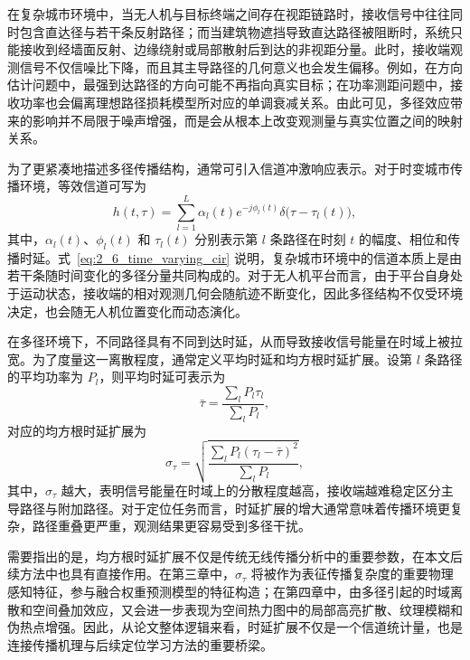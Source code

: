 在复杂城市环境中，当无人机与目标终端之间存在视距链路时，接收信号中往往同时包含直达径与若干条反射路径；而当建筑物遮挡导致直达路径被阻断时，系统只能接收到经墙面反射、边缘绕射或局部散射后到达的非视距分量。此时，接收端观测信号不仅信噪比下降，而且其主导路径的几何意义也会发生偏移。例如，在方向估计问题中，最强到达路径的方向可能不再指向真实目标；在功率测距问题中，接收功率也会偏离理想路径损耗模型所对应的单调衰减关系。由此可见，多径效应带来的影响并不局限于噪声增强，而是会从根本上改变观测量与真实位置之间的映射关系。

为了更紧凑地描述多径传播结构，通常可引入信道冲激响应表示。对于时变城市传播环境，等效信道可写为
\begin{equation}
h(t,\tau)
=
\sum_{l=1}^{L}
\alpha_l(t)
e^{-j\phi_l(t)}
\delta\big(\tau-\tau_l(t)\big),
\label{eq:2_6_time_varying_cir}
\end{equation}
其中，$\alpha_l(t)$、$\phi_l(t)$ 和 $\tau_l(t)$ 分别表示第 $l$ 条路径在时刻 $t$ 的幅度、相位和传播时延。式~\eqref{eq:2_6_time_varying_cir} 说明，复杂城市环境中的信道本质上是由若干条随时间变化的多径分量共同构成的。对于无人机平台而言，由于平台自身处于运动状态，接收端的相对观测几何会随航迹不断变化，因此多径结构不仅受环境决定，也会随无人机位置变化而动态演化。

在多径环境下，不同路径具有不同到达时延，从而导致接收信号能量在时域上被拉宽。为了度量这一离散程度，通常定义平均时延和均方根时延扩展。设第 $l$ 条路径的平均功率为 $P_l$，则平均时延可表示为
\begin{equation}
\bar{\tau}
=
\frac{\sum_{l} P_l \tau_l}{\sum_{l} P_l},
\label{eq:2_7_mean_delay}
\end{equation}
对应的均方根时延扩展为
\begin{equation}
\sigma_{\tau}
=
\sqrt{
\frac{\sum_{l} P_l(\tau_l-\bar{\tau})^2}{\sum_{l} P_l}
},
\label{eq:2_8_rms_delay_spread}
\end{equation}
其中，$\sigma_{\tau}$ 越大，表明信号能量在时域上的分散程度越高，接收端越难稳定区分主导路径与附加路径。对于定位任务而言，时延扩展的增大通常意味着传播环境更复杂，路径重叠更严重，观测结果更容易受到多径干扰。

需要指出的是，均方根时延扩展不仅是传统无线传播分析中的重要参数，在本文后续方法中也具有直接作用。在第三章中，$\sigma_{\tau}$ 将被作为表征传播复杂度的重要物理感知特征，参与融合权重预测模型的特征构造；在第四章中，由多径引起的时域离散和空间叠加效应，又会进一步表现为空间热力图中的局部高亮扩散、纹理模糊和伪热点增强。因此，从论文整体逻辑来看，时延扩展不仅是一个信道统计量，也是连接传播机理与后续定位学习方法的重要桥梁。

